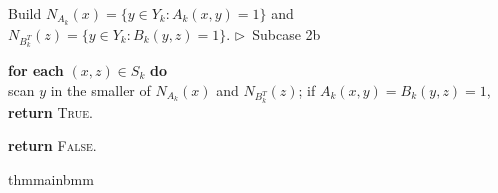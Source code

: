 \documentclass[11pt]{article}
\newcommand{\innercustomthm}{}
\theoremstyle{definition}
\newcommand{\algcomment}[1]{\hfill $\triangleright$~{\small #1}}
\renewcommand{\label}[1]{}%
\newcommand{\restatethm}[2]{%
  \begingroup
  \renewcommand{\innercustomthm}{\ref{#2}}%
  \csname #1\endcsname
  \endgroup
}
\begin{document}
\begin{algorithm}[!htbp]
\begin{algsteps}
    \item \qquad Build $N_{A_k}(x) = \{y \in Y_k : A_k(x, y) = 1\}$ and $N_{B_k^T}(z) = \{y \in Y_k : B_k(y, z) = 1\}$. \algcomment{Subcase 2b} \label{line:tri-adj}
    \item \qquad \textbf{for each} $(x, z) \in S_k$ \textbf{do}\\
    \qquad\quad scan $y$ in the smaller of $N_{A_k}(x)$ and $N_{B_k^T}(z)$; if $A_k(x, y) = B_k(y, z) = 1$, \textbf{return} \textnormal{\textsc{True}}. \label{line:tri-cs}
    \item \textbf{return} \textnormal{\textsc{False}}. \label{line:tri-false}
\end{algsteps}
\end{algorithm}

\restatethm{thmmainbmm}{thm:main-bmm}
\end{document}
